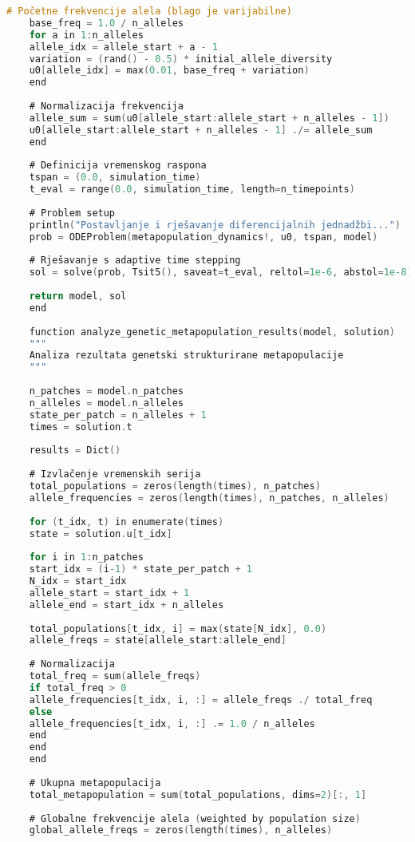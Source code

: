 \documentclass[11pt,oneside]{book}
\begin{document}
\begin{lstlisting}[language=C, caption=Julia implementacija genetski strukturiranog metapopulacijskog modela]
	# Početne frekvencije alela (blago je varijabilne)
	base_freq = 1.0 / n_alleles
	for a in 1:n_alleles
	allele_idx = allele_start + a - 1
	variation = (rand() - 0.5) * initial_allele_diversity
	u0[allele_idx] = max(0.01, base_freq + variation)
	end
	
	# Normalizacija frekvencija
	allele_sum = sum(u0[allele_start:allele_start + n_alleles - 1])
	u0[allele_start:allele_start + n_alleles - 1] ./= allele_sum
	end
	
	# Definicija vremenskog raspona
	tspan = (0.0, simulation_time)
	t_eval = range(0.0, simulation_time, length=n_timepoints)
	
	# Problem setup
	println("Postavljanje i rješavanje diferencijalnih jednadžbi...")
	prob = ODEProblem(metapopulation_dynamics!, u0, tspan, model)
	
	# Rješavanje s adaptive time stepping
	sol = solve(prob, Tsit5(), saveat=t_eval, reltol=1e-6, abstol=1e-8)
	
	return model, sol
	end
	
	function analyze_genetic_metapopulation_results(model, solution)
	"""
	Analiza rezultata genetski strukturirane metapopulacije
	"""
	
	n_patches = model.n_patches
	n_alleles = model.n_alleles
	state_per_patch = n_alleles + 1
	times = solution.t
	
	results = Dict()
	
	# Izvlačenje vremenskih serija
	total_populations = zeros(length(times), n_patches)
	allele_frequencies = zeros(length(times), n_patches, n_alleles)
	
	for (t_idx, t) in enumerate(times)
	state = solution.u[t_idx]
	
	for i in 1:n_patches
	start_idx = (i-1) * state_per_patch + 1
	N_idx = start_idx
	allele_start = start_idx + 1
	allele_end = start_idx + n_alleles
	
	total_populations[t_idx, i] = max(state[N_idx], 0.0)
	allele_freqs = state[allele_start:allele_end]
	
	# Normalizacija
	total_freq = sum(allele_freqs)
	if total_freq > 0
	allele_frequencies[t_idx, i, :] = allele_freqs ./ total_freq
	else
	allele_frequencies[t_idx, i, :] .= 1.0 / n_alleles
	end
	end
	end
	
	# Ukupna metapopulacija
	total_metapopulation = sum(total_populations, dims=2)[:, 1]
	
	# Globalne frekvencije alela (weighted by population size)
	global_allele_freqs = zeros(length(times), n_alleles)
	

\end{lstlisting}
\end{document}
